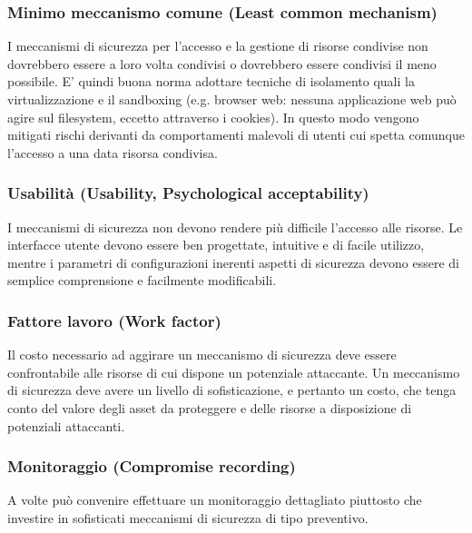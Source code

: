 \subsubsection{Minimo meccanismo comune (Least common mechanism)} 
I meccanismi di sicurezza per l'accesso e la gestione di risorse condivise non dovrebbero essere a loro volta condivisi o dovrebbero essere condivisi il meno possibile. E' quindi buona norma adottare tecniche di isolamento quali la virtualizzazione e il sandboxing (e.g. browser web: nessuna applicazione web può agire sul filesystem, eccetto attraverso i cookies). In questo modo vengono mitigati rischi derivanti da comportamenti malevoli di utenti cui spetta comunque l'accesso a una data risorsa condivisa.

\subsubsection{Usabilità (Usability, Psychological acceptability)} 
I meccanismi di sicurezza non devono rendere più difficile l'accesso alle risorse. Le interfacce utente devono essere ben progettate, intuitive e di facile utilizzo, mentre i parametri di configurazioni inerenti aspetti di sicurezza devono essere di semplice comprensione e facilmente modificabili.

\subsubsection{Fattore lavoro (Work factor)} 
Il costo necessario ad aggirare un meccanismo di sicurezza deve essere confrontabile alle risorse di cui dispone un potenziale attaccante. Un meccanismo di sicurezza deve avere un livello di sofisticazione, e pertanto un costo, che tenga conto del valore degli asset da proteggere e delle risorse a disposizione di potenziali attaccanti.

\subsubsection{Monitoraggio (Compromise recording)} 
A volte può convenire effettuare un monitoraggio dettagliato piuttosto che investire in sofisticati meccanismi di sicurezza di tipo preventivo.

